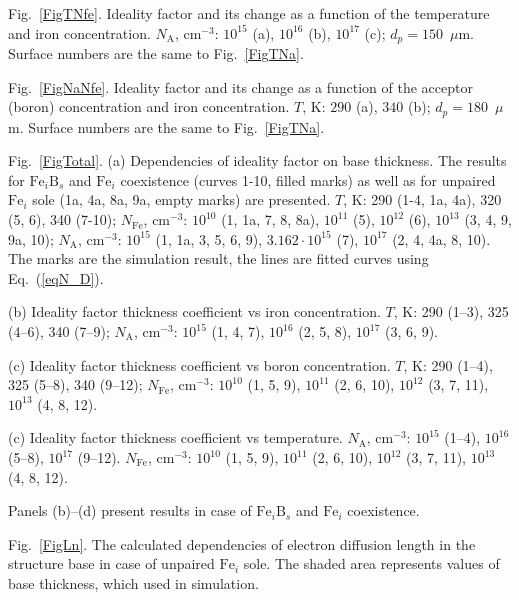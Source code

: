 \documentclass[12pt]{article}
\begin{document}
 Fig.~\ref{FigTNfe}.
Ideality factor and its change as a function of the temperature and iron concentration.
$N_\mathrm{A}$, cm$^{-3}$: $10^{15}$ (a), $10^{16}$ (b), $10^{17}$ (c);
$d_p=150$~$\mu$m.
Surface numbers are the same to Fig.~\ref{FigTNa}.

 Fig.~\ref{FigNaNfe}.
Ideality factor and its change as a function of the acceptor (boron) concentration and iron concentration.
$T$, K: $290$ (a), $340$ (b);
$d_p=180$~$\mu$m.
Surface numbers are the same to Fig.~\ref{FigTNa}.


 Fig.~\ref{FigTotal}.
(a) Dependencies of ideality factor on base thickness.
The results for $\mathrm{Fe}_i\mathrm{B}_s$ and $\mathrm{Fe}_i$ coexistence (curves 1-10, filled marks)
as well as for unpaired $\mathrm{Fe}_i$ sole (1a, 4a, 8a, 9a, empty marks) are presented.
$T$, K: 290 (1-4, 1a, 4a), 320 (5, 6), 340 (7-10);
$N_\mathrm{Fe}$, cm$^{-3}$: $10^{10}$ (1, 1a, 7, 8, 8a), $10^{11}$ (5), $10^{12}$ (6), $10^{13}$ (3, 4, 9, 9a, 10);
$N_\mathrm{A}$, cm$^{-3}$: $10^{15}$ (1, 1a, 3, 5, 6, 9), $3.162\cdot10^{15}$ (7),  $10^{17}$ (2, 4, 4a, 8, 10).
The marks are the simulation result,
the lines are fitted curves using Eq.~(\ref{eqN_D}).

(b) Ideality factor thickness coefficient vs iron concentration.
$T$, K: 290 (1--3), 325 (4--6), 340 (7--9);
$N_\mathrm{A}$, cm$^{-3}$: $10^{15}$ (1, 4, 7), $10^{16}$ (2, 5, 8),  $10^{17}$ (3, 6, 9).

(c) Ideality factor thickness coefficient vs boron concentration.
$T$, K: 290 (1--4), 325 (5--8), 340 (9--12);
$N_\mathrm{Fe}$, cm$^{-3}$: $10^{10}$ (1, 5, 9), $10^{11}$ (2, 6, 10),  $10^{12}$ (3, 7, 11), $10^{13}$ (4, 8, 12).

(c) Ideality factor thickness coefficient vs temperature.
$N_\mathrm{A}$, cm$^{-3}$: $10^{15}$ (1--4), $10^{16}$ (5--8),  $10^{17}$ (9--12).
$N_\mathrm{Fe}$, cm$^{-3}$: $10^{10}$ (1, 5, 9), $10^{11}$ (2, 6, 10),  $10^{12}$ (3, 7, 11), $10^{13}$ (4, 8, 12).

Panels (b)--(d) present results in  case of $\mathrm{Fe}_i\mathrm{B}_s$ and $\mathrm{Fe}_i$ coexistence.

 Fig.~\ref{FigLn}.
The calculated dependencies of electron diffusion length in the structure base
in case of unpaired $\mathrm{Fe}_i$ sole.
The shaded area represents values of base thickness, which used in simulation.



\newpage
\end{document}
